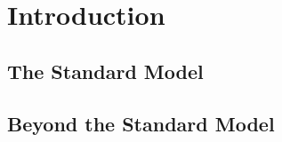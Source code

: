 \chapter{Introduction}
\label{intro}

\section{The Standard Model}

\section{Beyond the Standard Model}


